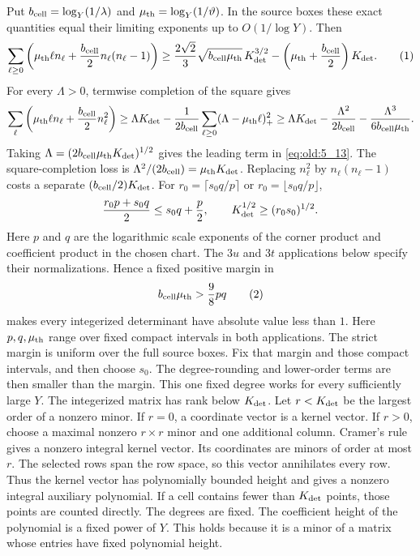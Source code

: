 Put \(b_{\rm cell}=\log_Y(1/\lambda)\) and
\(\mu_{\rm th}=\log_Y(1/\vartheta)\). In the source boxes these exact
quantities equal their limiting exponents up to \(O(1/\log Y)\). Then
\[
\sum_{\ell\ge0}\left(\mu_{\rm th}\ell n_\ell+
 \frac {b_{\rm cell}}2 n_\ell(n_\ell-1)\right)
\ge \frac{2\sqrt2}{3}\sqrt{b_{\rm cell}\mu_{\rm th}}\,K_{\rm det}^{3/2}
-\left(\mu_{\rm th}+\frac {b_{\rm cell}}2\right)K_{\rm det}.
\AutoTag{eq:old:5_13}
\]
For every \(\Lambda>0\), termwise completion of the square gives
\[
\sum_\ell\left(\mu_{\rm th}\ell n_\ell+\frac {b_{\rm cell}}2n_\ell^2\right)
\ge \Lambda K_{\rm det}-\frac1{2b_{\rm cell}}\sum_{\ell\ge0}(\Lambda-\mu_{\rm th}\ell)_+^2
\ge \Lambda K_{\rm det}-\frac{\Lambda^2}{2b_{\rm cell}}-\frac{\Lambda^3}{6b_{\rm cell}\mu_{\rm th}}.
\]
Taking \(\Lambda=(2b_{\rm cell}\mu_{\rm th}K_{\rm det})^{1/2}\) gives the leading
term in \eqref{eq:old:5_13}. The square-completion loss is
\(\Lambda^2/(2b_{\rm cell})=\mu_{\rm th}K_{\rm det}\). Replacing \(n_\ell^2\) by
\(n_\ell(n_\ell-1)\) costs a separate \((b_{\rm cell}/2)K_{\rm det}\).
For \(r_0=\lceil s_0 q/p\rceil\) or \(r_0=\lfloor s_0 q/p\rfloor\),
\[
\frac{r_0p+s_0q}{2}\le s_0q+\frac p2,\qquad
K_{\rm det}^{1/2}\ge (r_0s_0)^{1/2}.
\]
Here \(p\) and \(q\) are the logarithmic scale exponents of the corner
product and coefficient product in the chosen chart. The \(3u\) and \(3t\)
applications below specify their normalizations. Hence a fixed
positive margin in
\[
b_{\rm cell}\mu_{\rm th}>\frac98pq
\AutoTag{eq:old:5_14}
\]
makes every integerized determinant have absolute value less than \(1\).
Here \(p,q,\mu_{\rm th}\) range over fixed compact intervals in both
applications. The strict margin is uniform over the full source boxes.
Fix that margin and those compact intervals, and then choose \(s_0\).
The degree-rounding and lower-order terms are then smaller than the margin.
This one fixed degree works for every sufficiently large \(Y\).
The integerized matrix has rank below \(K_{\rm det}\). Let \(r<K_{\rm det}\)
be the largest order of a nonzero minor. If \(r=0\), a coordinate vector
is a kernel vector. If \(r>0\), choose a maximal nonzero \(r\times r\)
minor and one additional column. Cramer's rule gives a nonzero integral
kernel vector. Its coordinates are minors of order at most \(r\). The selected rows
span the row space, so this vector annihilates every row. Thus the kernel
vector has polynomially bounded height and gives a nonzero integral
auxiliary polynomial.
If a cell contains fewer than \(K_{\rm det}\) points, those points are counted
directly. The degrees are fixed. The coefficient height of the
polynomial is a fixed power of \(Y\). This holds because it is a minor of
a matrix whose entries have fixed polynomial height.

